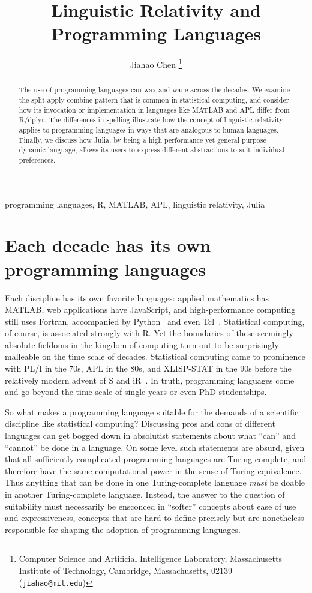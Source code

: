 \documentclass[11pt]{asaproc}
\title{Linguistic Relativity and Programming Languages}
\author{
    Jiahao Chen
    \thanks{Computer Science and Artificial Intelligence Laboratory,
               Massachusetts Institute of Technology,
               Cambridge, Massachusetts, 02139 ({\tt jiahao@mit.edu})}
}
\begin{document}
\maketitle

\begin{abstract}
The use of programming languages can wax and wane across the decades. We
examine the split-apply-combine pattern that is common in statistical
computing, and consider how its invocation or implementation in languages like
MATLAB and APL differ from R/dplyr. The differences in spelling illustrate how
the concept of linguistic relativity applies to programming languages in ways
that are analogous to human languages. Finally, we discuss how Julia, by being
a high performance yet general purpose dynamic language, allows its users to
express different abstractions to suit individual preferences.
\end{abstract}

\begin{keywords}
    programming languages, R, MATLAB, APL, linguistic relativity, Julia
\end{keywords}

\section{Each decade has its own programming languages}

Each discipline has its own favorite languages: applied mathematics has MATLAB,
web applications have JavaScript, and high-performance computing still uses
Fortran, accompanied by Python~\citep{scipy} and even Tcl~\citep{Phillips2014}.
Statistical computing, of course, is associated strongly with R. Yet the
boundaries of these seemingly absolute fiefdoms in the kingdom of computing
turn out to be surprisingly malleable on the time scale of decades. Statistical
computing came to prominence with PL/I in the 70s, APL in the 80s, and
XLISP-STAT in the 90s before the relatively modern advent of S and
iR~\citep{deLeeuw2005}. In truth, programming languages come and go beyond the
time scale of single years or even PhD studentships.

So what makes a programming language suitable for the demands of a scientific
discipline like statistical computing?  Discussing pros and cons of different
languages can get bogged down in absolutist statements about what ``can'' and
``cannot'' be done in a language. On some level such statements are absurd,
given that all sufficiently complicated programming languages are Turing
complete, and therefore have the same computational power in the sense of
Turing equivalence. Thus anything that can be done in one Turing-complete
language \textit{must} be doable in another Turing-complete language. Instead,
the answer to the question of suitability must necessarily be ensconced in
``softer'' concepts about ease of use and expressiveness, concepts that are
hard to define precisely but are nonetheless responsible for shaping the
adoption of programming languages.
\end{document}
